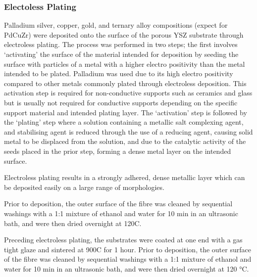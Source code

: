 \subsubsection{Electoless Plating}
Palladium silver, copper, gold, and ternary alloy compositions (expect for PdCuZr) were deposited onto the surface of the porous YSZ substrate through electroless plating. The process was performed in two steps; the first involves ‘activating’ the surface of the material intended for deposition by seeding the surface with particles of a metal with a 
higher electro positivity than the metal intended to be plated. Palladium was used due to its high electro positivity compared to other metals commonly plated through electroless deposition. This activation step is required for non-conductive supports such as ceramics and glass but is usually not required for conductive supports depending on the specific support material and intended plating layer. The ‘activation’ step is followed by the ‘plating’ step where a solution containing a metallic salt complexing agent, and stabilising agent is reduced through the use of a reducing agent, causing solid metal to be displaced from the 
solution, and due to the catalytic activity of the seeds placed in the prior step, forming a dense metal layer on the intended surface. 

Electroless plating results in a strongly adhered, dense metallic layer which can be deposited easily on a large range of morphologies.

Prior to deposition, the outer surface of the fibre was cleaned by sequential washings with a 1:1 mixture of ethanol and water for 10 min in an ultrasonic bath, and were then dried overnight at 120\textdegree C.

Preceding electroless plating, the substrates were coated at one end with a gas tight glaze and sintered at 900\textdegree C for 1 hour. Prior to deposition, the outer surface of the fibre was cleaned by sequential washings with a 1:1 mixture of ethanol and water for 10 min in an ultrasonic bath, and were then dried overnight at 120 °C.

